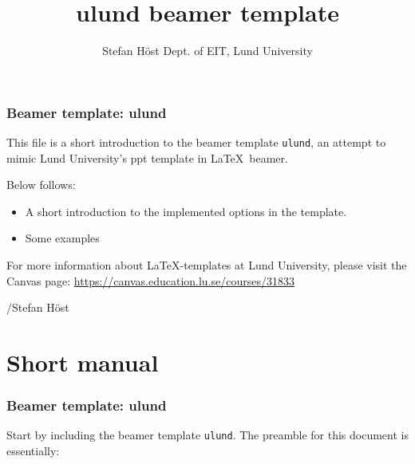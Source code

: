 \documentclass[aspectratio=1610]{beamer}
\title[ulund beamer]{ulund beamer template}
\author[S. Höst]{%
  Stefan Höst\newline
  Dept. of EIT, Lund University}
\begin{document}
\begin{frame}[plain]%
  \titlepage
\end{frame}

\begin{frame}
  \frametitle{Beamer template: ulund}
  This file is a short introduction to the beamer template \texttt{ulund}, an attempt to mimic Lund University's ppt template in \LaTeX\ beamer.

  
Below follows:
\begin{itemize}
\item A short introduction to the implemented options in the template. 
\item Some examples
\end{itemize}
For more information about \LaTeX-templates at Lund University, please visit the Canvas page: \url{https://canvas.education.lu.se/courses/31833}

\strut\par
/Stefan Höst
\end{frame}


\section{Short manual}

\begin{frame}[fragile]
  \frametitle{Beamer template: ulund}
  Start by including the beamer template \texttt{ulund}. The preamble for this document is essentially: 
\end{frame}
\end{document}
